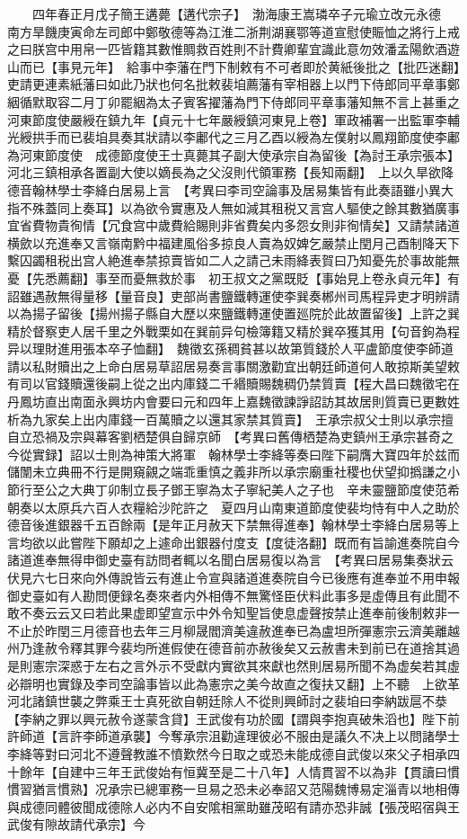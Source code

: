 　　四年春正月戊子簡王遘薨【遘代宗子】　渤海康王嵩璘卒子元瑜立改元永德　南方旱饑庚寅命左司郎中鄭敬德等為江淮二浙荆湖襄鄂等道宣慰使賑恤之將行上戒之曰朕宫中用帛一匹皆籍其數惟賙救百姓則不計費卿輩宜識此意勿效潘孟陽飲酒遊山而已【事見元年】　給事中李藩在門下制敕有不可者即於黄紙後批之【批匹迷翻】吏請更連素紙藩曰如此乃狀也何名批敕裴垍薦藩有宰相器上以門下侍郎同平章事鄭絪循默取容二月丁卯罷絪為太子賓客擢藩為門下侍郎同平章事藩知無不言上甚重之　河東節度使嚴綬在鎮九年【貞元十七年嚴綬鎮河東見上卷】軍政補署一出監軍李輔光綬拱手而已裴垍具奏其狀請以李鄘代之三月乙酉以綬為左僕射以鳳翔節度使李鄘為河東節度使　成德節度使王士真薨其子副大使承宗自為留後【為討王承宗張本】河北三鎮相承各置副大使以嫡長為之父沒則代領軍務【長知兩翻】　上以久旱欲降德音翰林學士李絳白居易上言　【考異曰李司空論事及居易集皆有此奏語雖小異大指不殊蓋同上奏耳】以為欲令實惠及人無如減其租税又言宫人驅使之餘其數猶廣事宜省費物貴徇情【冗食宫中歲費給賜則非省費矣内多怨女則非徇情矣】又請禁諸道横歛以充進奉又言嶺南黔中福建風俗多掠良人賣為奴婢乞嚴禁止閏月己酉制降天下繫囚蠲租税出宫人絶進奉禁掠賣皆如二人之請己未雨絳表賀曰乃知憂先於事故能無憂【先悉薦翻】事至而憂無救於事　初王叔文之黨既貶【事始見上卷永貞元年】有詔雖遇赦無得量移【量音良】吏部尚書鹽鐵轉運使李巽奏郴州司馬程异吏才明辨請以為揚子留後【揚州揚子縣自大歷以來鹽鐵轉運使置廵院於此故置留後】上許之巽精於督察吏人居千里之外戰栗如在巽前异句檢簿籍又精於巽卒獲其用【句音鉤為程异以理財進用張本卒子恤翻】　魏徵玄孫稠貧甚以故第質錢於人平盧節度使李師道請以私財贖出之上命白居易草詔居易奏言事關激勸宜出朝廷師道何人敢掠斯美望敕有司以官錢贖還後嗣上從之出内庫錢二千緡贖賜魏稠仍禁質賣【程大昌曰魏徵宅在丹鳳坊直出南面永興坊内會要曰元和四年上嘉魏徵諫諍詔訪其故居則質賣已更數姓析為九家矣上出内庫錢一百萬贖之以還其家禁其質賣】　王承宗叔父士則以承宗擅自立恐禍及宗與幕客劉栖楚俱自歸京師　【考異曰舊傳栖楚為吏鎮州王承宗甚奇之今從實録】詔以士則為神策大將軍　翰林學士李絳等奏曰陛下嗣膺大寶四年於兹而儲闈未立典冊不行是開窺覦之端乖重慎之義非所以承宗廟重社稷也伏望抑撝謙之小節行至公之大典丁卯制立長子鄧王寧為太子寧紀美人之子也　辛未靈鹽節度使范希朝奏以太原兵六百人衣糧給沙陀許之　夏四月山南東道節度使裴均恃有中人之助於德音後進銀器千五百餘兩【是年正月赦天下禁無得進奉】翰林學士李絳白居易等上言均欲以此嘗陛下願却之上遽命出銀器付度支【度徒洛翻】既而有旨諭進奏院自今諸道進奉無得申御史臺有訪問者輒以名聞白居易復以為言　【考異曰居易集奏狀云伏見六七日來向外傳說皆云有進止令宣與諸道進奏院自今已後應有進奉並不用申報御史臺如有人勘問便録名奏來者内外相傳不無驚怪臣伏料此事多是虛傳且有此聞不敢不奏云云又曰若此果虚即望宣示中外令知聖旨使息虚聲按禁止進奉前後制敕非一不止於昨閏三月德音也去年三月柳晟閻濟美違赦進奉已為盧坦所彈憲宗云濟美離越州乃逢赦令釋其罪今裴均所進假使在德音前亦赦後矣又云赦書未到前已在道捨其過是則憲宗深惑于左右之言外示不受獻内實欲其來獻也然則居易所聞不為虚矣若其虛必辯明也實錄及李司空論事皆以此為憲宗之美今故直之復扶又翻】上不聽　上欲革河北諸鎮世襲之弊乘王士真死欲自朝廷除人不從則興師討之裴垍曰李納跋扈不㳟【李納之罪以興元赦令遂蒙含貸】王武俊有功於國【謂與李抱真破朱滔也】陛下前許師道【言許李師道承襲】今奪承宗沮勸違理彼必不服由是議久不决上以問諸學士李絳等對曰河北不遵聲教誰不憤歎然今日取之或恐未能成德自武俊以來父子相承四十餘年【自建中三年王武俊始有恒冀至是二十八年】人情貫習不以為非【貫讀曰慣慣習猶言慣熟】况承宗已總軍務一旦易之恐未必奉詔又范陽魏博易定淄青以地相傳與成德同體彼聞成德除人必内不自安隂相黨助雖茂昭有請亦恐非誠【張茂昭宿與王武俊有隙故請代承宗】今